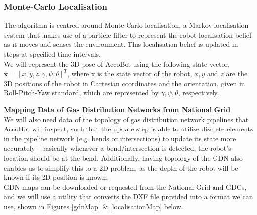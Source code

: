 \documentclass[11pt]{article}		%
\begin{document}
		\subsubsection{Monte-Carlo Localisation}
	    The algorithm is centred around Monte-Carlo localisation, a Markov localisation system that makes use of a particle filter to represent the robot localisation belief as it moves and senses the environment. This localisation belief is updated in steps at specified time intervals. 
	    \\ \hspace*{3ex}We will represent the 3D pose of AccoBot using the following state vector,     $\boldsymbol{x}=[x,  y,  z,  \gamma,  \psi,\theta]^{T}$, where x is the state vector
        of the robot, $x, y$ and $z$ are the 3D positions of the robot in Cartesian coordinates and the orientation,
        given in Roll-Pitch-Yaw standard, which are represented by $\gamma,  \psi,\theta$, respectively.
        
        \textbf{Mapping Data of Gas Distribution Networks from National Grid}
        \\We will also need data of the topology of gas distribution network pipelines that AccoBot will inspect, such that the update step is able to utilise discrete elements in the pipeline network (e.g. bends or intersections) to update its state more accurately - basically whenever a bend/intersection is detected, the robot's location should be at the bend. Additionally, having topology of the GDN also enables us to simplify this to a 2D problem, as the depth of the robot will be known if its 2D position is known.
        \\ \hspace*{3ex}GDN maps can be downloaded or requested from the National Grid and GDCs, and we will use a utility that converts the DXF file provided into a format we can use, shown in \hyperref[gdnMap]{Figures \ref*{gdnMap} \& \ref*{localisationMap}} below.
        
\end{document}
